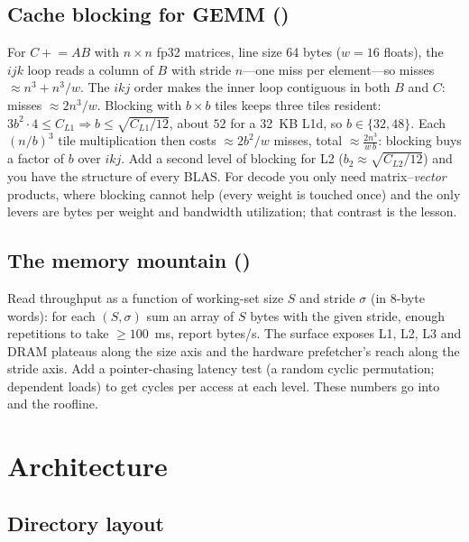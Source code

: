 \subsection{Cache blocking for GEMM ()}

For $C \mathrel{+}= AB$ with $n\times n$ fp32 matrices, line size 64 bytes ($w=16$ floats), the $ijk$ loop reads a column of $B$ with stride $n$---one miss per element---so misses $\approx n^3 + n^3/w$. The $ikj$ order makes the inner loop contiguous in both $B$ and $C$: misses $\approx 2n^3/w$. Blocking with $b\times b$ tiles keeps three tiles resident: $3b^2\cdot 4 \le C_{L1} \Rightarrow b \le \sqrt{C_{L1}/12}$, about $52$ for a 32~KB L1d, so $b\in\{32, 48\}$. Each $(n/b)^3$ tile multiplication then costs $\approx 2b^2/w$ misses, total $\approx \tfrac{2n^3}{w\,b}$: blocking buys a factor of $b$ over $ikj$. Add a second level of blocking for L2 ($b_2 \approx \sqrt{C_{L2}/12}$) and you have the structure of every BLAS. For decode you only need matrix--\emph{vector} products, where blocking cannot help (every weight is touched once) and the only levers are bytes per weight and bandwidth utilization; that contrast is the lesson.

\subsection{The memory mountain ()}

Read throughput as a function of working-set size $S$ and stride $\sigma$ (in 8-byte words): for each $(S,\sigma)$ sum an array of $S$ bytes with the given stride, enough repetitions to take $\ge 100$~ms, report bytes/s. The surface exposes L1, L2, L3 and DRAM plateaus along the size axis and the hardware prefetcher's reach along the stride axis. Add a pointer-chasing latency test (a random cyclic permutation; dependent loads) to get cycles per access at each level. These numbers go into  and the roofline.

\section{Architecture}

\subsection{Directory layout}

